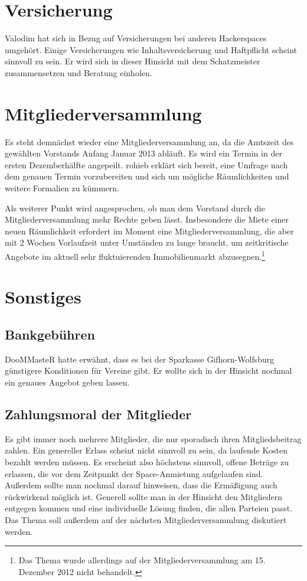 \documentclass[a4paper,12pt]{scrartcl}
\begin{document}
\section{Versicherung}
Valodim hat sich in Bezug auf Versicherungen bei anderen Hackerspaces umgehört.
Einige Versicherungen wie Inhaltsversicherung und Haftpflicht scheint sinnvoll
zu sein. Er wird sich in dieser Hinsicht mit dem Schatzmeister zusammensetzen
und Beratung einholen.

\section{Mitgliederversammlung}
Es steht demnächst wieder eine Mitgliederversammlung an, da die Amtszeit des
gewählten Vorstands Anfang Januar 2013 abläuft. Es wird ein Termin in der ersten
Dezemberhälfte angepeilt. rohieb erklärt sich bereit, eine Umfrage nach dem
genauen Termin vorzubereiten und sich um mögliche Räumlichkeiten und weitere
Formalien zu kümmern.

Als weiterer Punkt wird angesprochen, ob man dem Vorstand durch die
Mitgliederversammlung mehr Rechte geben lässt. Insbesondere die Miete einer
neuen Räumlichkeit erfordert im Moment eine Mitgliederversammlung, die aber mit
2 Wochen Vorlaufzeit unter Umständen zu lange braucht, um zeitkritische Angebote
im aktuell sehr fluktuierenden Immobilienmarkt abzusegnen.\footnote{Das Thema
wurde allerdings auf der Mitgliederversammlung am 15. Dezember 2012 nicht
behandelt.}

\section{Sonstiges}
\subsection{Bankgebühren}
DooMMasteR hatte erwähnt, dass es bei der Sparkasse Gifhorn-Wolfsburg günstigere
Konditionen für Vereine gibt. Er wollte sich in der Hinsicht nochmal ein genaues
Angebot geben lassen.

\subsection{Zahlungsmoral der Mitglieder}
Es gibt immer noch mehrere Mitglieder, die nur sporadisch ihren Mitgliedsbeitrag
zahlen. Ein genereller Erlass scheint nicht sinnvoll zu sein, da laufende Kosten
bezahlt werden müssen. Es erscheint also höchstens sinnvoll, offene Beträge zu
erlassen, die vor dem Zeitpunkt der Space-Anmietung aufgelaufen sind. Außerdem
sollte man nochmal darauf hinweisen, dass die Ermäßigung auch rückwirkend
möglich ist.  Generell sollte man in der Hinsicht den Mitgliedern entgegen
kommen und eine individuelle Lösung finden, die allen Parteien passt. Das Thema
soll außerdem auf der nächsten Mitgliederversammlung diskutiert werden.
\end{document}
